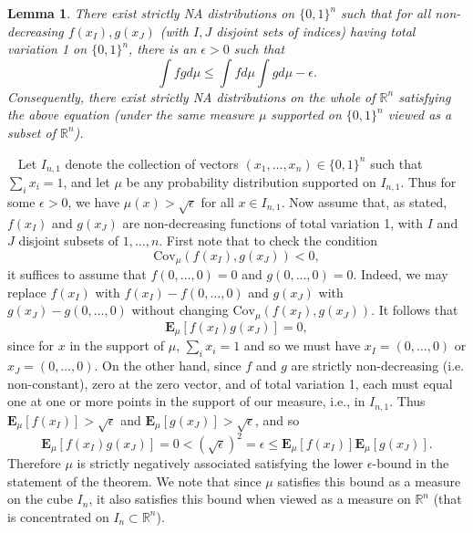 \documentclass[11pt]{article}
\newcommand{\E}{\mathbf{E}}
\newcommand{\R}{\mathbb{R}}
\newcommand{\C}{\text{Cov}}
\newtheorem{lemma}{Lemma}
\newenvironment{Proof}{\noindent{\bf Proof} \ }{\QED}\smallskip
\newcommand\QED{\newline \rightline{$\blacksquare$} \bigskip}
\begin{document}
\begin{lemma}\label{strictNAexist}
There exist strictly NA distributions on $\{0,1\}^n$
such that for all non-decreasing $f(x_I),g(x_J)$ (with $I,J$ disjoint sets of indices) having total variation 1 on $\{0,1\}^n$, there is an $\epsilon>0$ such that
\[
\int fg d\mu \leq \int f d\mu \int g d\mu  -\epsilon .
\]
Consequently, there exist strictly NA distributions on the whole of $\R^n$ satisfying the above equation (under the same measure $\mu$ supported on $\{0,1\}^n$ viewed as a subset of $\R^n$).
\end{lemma}
\begin{Proof}
Let $I_{n,1}$ denote the collection of vectors $(x_1,\dots, x_n) \in \{0,1\}^n$ such that $\sum_i x_i = 1$, and let $\mu$ be any probability distribution supported on $I_{n,1}$. Thus for some $\epsilon>0$, we have $\mu(x)>\sqrt{\epsilon}$ for all $x\in I_{n,1}$. %
Now assume that, as stated, $f(x_I)$ and $g(x_J)$ are non-decreasing functions of total variation 1, with $I$ and $J$ disjoint subsets of ${1,\ldots, n}$. First note that to check the condition 
\[
\C_{\mu}(f(x_I),g(x_J)) <0,
\]
it suffices to assume that $f(0,\dots,0) = 0$ and $g(0,\dots, 0) = 0$. Indeed, we may replace $f(x_I)$ with $f(x_I) - f(0,\dots, 0)$ and $g(x_J)$ with $g(x_J) - g(0,\dots, 0)$ without changing $\C_{\mu} (f(x_I),g(x_J))$. 
It follows that 
\[
\E_{\mu}[ f(x_I)g(x_J)]=0,
\]
since for $x$ in the support of $\mu$, $\sum_ix_i=1$ and so we must have $x_I=(0,\dots, 0)$ or
$x_J=(0,\dots, 0)$. On the other hand, since $f$ and $g$ are strictly non-decreasing (i.e. non-constant), zero at the zero vector, and of total variation 1, each must equal one at one or more points in the support of our measure, i.e., in $I_{n,1}$.
Thus $\E_{\mu}[f(x_I)]>\sqrt{\epsilon}$ and $\E_{\mu}[g(x_J)] >\sqrt{\epsilon}$, and so 
\[
\E_{\mu}[ f(x_I)g(x_J)]=0 <
(\sqrt{\epsilon})^2=\epsilon\leq
\E_{\mu}[f(x_I)]\E_{\mu}[g(x_J)].
\]
Therefore $\mu$ is strictly negatively associated satisfying the lower $\epsilon$-bound in the statement of the theorem.
We note that since $\mu$ satisfies this bound as a measure on the cube $I_n$, it also satisfies this bound when viewed as a measure on $\R^n$ (that is concentrated on $I_n\subset \R^n$).
\end{Proof}
\end{document}
